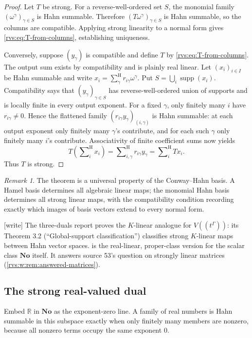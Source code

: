 \documentclass[11pt,letterpaper]{article}
\numberwithin{equation}{section}
\theoremstyle{definition}
\theoremstyle{remark}
\newtheorem{remark}[theorem]{Remark}
\newcommand{\No}{\mathbf{No}}
\newcommand{\R}{\mathbb{R}}
\newcommand{\supp}{\operatorname{supp}}
\newcommand{\sH}{\mathop{\sum}\nolimits^{\mathrm H}}
\newcommand{\wtag}{\textup{[write]}}%
\begin{document}
\begin{proof}
Let \(T\) be strong.  For a reverse-well-ordered set \(S\), the monomial
family \((\omega^\gamma)_{\gamma\in S}\) is Hahn summable.  Therefore
\((T\omega^\gamma)_{\gamma\in S}\) is Hahn summable, so the columns are
compatible.  Applying strong linearity to a normal form gives
\eqref{rvs:eq:T-from-columns}, establishing uniqueness.

Conversely, suppose \((y_\gamma)\) is compatible and define \(T\) by
\eqref{rvs:eq:T-from-columns}.  The output sum exists by compatibility and is
plainly real linear.  Let \((x_i)_{i\in I}\) be Hahn summable and write
\(x_i=\sH_\gamma r_{i\gamma}\omega^\gamma\).  Put
\(S=\bigcup_i\supp(x_i)\).  Compatibility says that
\((y_\gamma)_{\gamma\in S}\) has reverse-well-ordered union of supports and
is locally finite in every output exponent.  For a fixed \(\gamma\), only
finitely many \(i\) have \(r_{i\gamma}\ne0\).  Hence the flattened family
\((r_{i\gamma}y_\gamma)_{(i,\gamma)}\) is Hahn summable: at each output
exponent only finitely many \(\gamma\)'s contribute, and for each such
\(\gamma\) only finitely many \(i\)'s contribute.  Associativity of finite
coefficient sums now yields
\[
 T\!\left(\sH_i x_i\right)
 =\sH_{i,\gamma}r_{i\gamma}y_\gamma
 =\sH_i Tx_i.
\]
Thus \(T\) is strong.
\end{proof}

\begin{remark}
The theorem is a universal property of the Conway--Hahn basis.  A Hamel basis
determines all algebraic linear maps; the monomial Hahn basis determines all
strong linear maps, with the compatibility condition recording exactly which
images of basis vectors extend to every normal form.
\end{remark}

\noindent\wtag{} The three-duals report proves the \(K\)-linear analogue
for \(V((t^\Gamma))\): its Theorem 3.2 (``Global-support classification'')
classifies strong \(K\)-linear maps between Hahn vector spaces.
 is the real-linear, proper-class version for the
scalar class \(\No\) itself.  It answers source 53's question on strongly
linear matrices (\cref{rvs:w:rem:answered-matrices}).

\subsection{The strong real-valued dual}\label{rvs:subsec:strong-dual}

Embed \(\R\) in \(\No\) as the exponent-zero line.  A family of real numbers
is Hahn summable in this subspace exactly when only finitely many members are
nonzero, because all nonzero terms occupy the same exponent \(0\).
\end{document}
